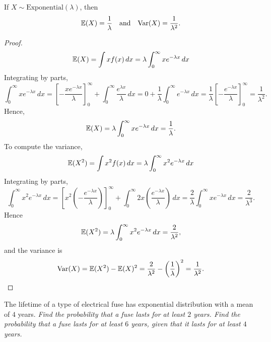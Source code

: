 \begin{lemma}
If $X\sim\text{Exponential}(\lambda)$, then 
\[
\mathbb{E}(X)= \frac{1}{\lambda} \quad\text{and}\quad \text{Var}(X) = \frac{1}{\lambda^2}.
\]
\end{lemma}

\begin{proof}
\[
\mathbb{E}(X) = \int xf(x)\,dx = \lambda\int_0^{\infty} xe^{-\lambda x}\,dx
\]
Integrating by parts,
\begin{equation*}\label{eq:expe_expo}
\int_0^{\infty} xe^{-\lambda x}\,dx
	= \left[-\frac{xe^{-\lambda x}}{\lambda}\right]_0^{\infty} + \int_0^{\infty} \frac{e^{\lambda x}}{\lambda}\,dx
	= 0 + \frac{1}{\lambda}\int_0^{\infty} e^{-\lambda x}\,dx
	= \frac{1}{\lambda}\left[-\frac{e^{-\lambda x}}{\lambda}\right]_0^{\infty}
	= \frac{1}{\lambda^2}.%
\end{equation*}
Hence, 
\[
\mathbb{E}(X) = \lambda\int_0^{\infty} xe^{-\lambda x}\,dx = \frac{1}{\lambda}.
\]
To compute the variance, 
\[
\mathbb{E}(X^2) = \int x^2 f(x)\,dx = \lambda\int_0^{\infty} x^2 e^{-\lambda x}\,dx
\]
Integrating by parts,
\[
\int_0^{\infty} x^2 e^{-\lambda x}\,dx
	= \left[x^2\left(-\frac{e^{-\lambda x}}{\lambda}\right)\right]_0^{\infty} + \int_0^\infty 2x\left(\frac{e^{-\lambda x}}{\lambda}\right)\,dx 
	= \frac{2}{\lambda}\int_0^{\infty} xe^{-\lambda x}\,dx 
	= \frac{2}{\lambda^3}.%
\]
Hence 
\[
\mathbb{E}(X^2) = \lambda\int_0^{\infty} x^2 e^{-\lambda x}\,dx = \frac{2}{\lambda^2},
\]
and the variance is 
\[
\text{Var}(X) = \mathbb{E}(X^2) - \mathbb{E}(X)^2 = \frac{2}{\lambda^2} - \left(\frac{1}{\lambda}\right)^2 = \frac{1}{\lambda^2}.
\]
\end{proof}

\begin{example}
The lifetime of a type of electrical fuse has exponential distribution with a mean of $4$ years. 
\ben
\it Find the probability that a fuse lasts for at least $2$ years.
\it Find the probability that a fuse lasts for at least $6$ years, given that it lasts for at least $4$ years.
\een
\end{example}

